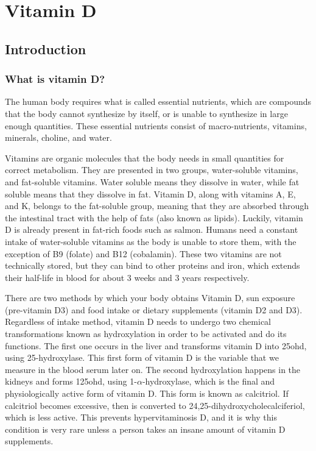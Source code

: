 \chapter{Vitamin D}\label{ch:vitD}

\section{Introduction}

\subsection{What is vitamin D?}

The human body requires what is called essential nutrients, which are compounds that the body cannot synthesize by itself, or is unable to synthesize in large enough quantities. These essential nutrients consist of macro-nutrients, vitamins, minerals, choline, and water.

Vitamins are organic molecules that the body needs in small quantities for correct metabolism. They are presented in two groups, water-soluble vitamins, and fat-soluble vitamins. Water soluble means they dissolve in water, while fat soluble means that they dissolve in fat. Vitamin D, along with vitamins A, E, and K, belongs to the fat-soluble group, meaning that they are absorbed through the intestinal tract with the help of fats (also known as lipids). Luckily, vitamin D is already present in fat-rich foods such as salmon. Humans need a constant intake of water-soluble vitamins as the body is unable to store them, with the exception of B9 (folate) and B12 (cobalamin). These two vitamins are not technically stored, but they can bind to other proteins and iron, which extends their half-life in blood for about 3 weeks and 3 years respectively.

There are two methods by which your body obtains Vitamin D, sun exposure (pre-vitamin D3) and food intake or dietary supplements (vitamin D2 and D3). Regardless of intake method, vitamin D needs to undergo two chemical transformations known as hydroxylation in order to be activated and do its functions. The first one occurs in the liver and transforms vitamin D into \gls{25ohd}, using 25-hydroxylase. This first form of vitamin D is the variable that we measure in the blood serum later on. The second hydroxylation happens in the kidneys and forms \gls{125ohd}, using 1-$\alpha$-hydroxylase, which is the final and physiologically active form of vitamin D. This form is known as calcitriol. If calcitriol becomes excessive, then is converted to 24,25-dihydroxycholecalciferiol, which is less active. This prevents hypervitaminosis D, and it is why this condition is very rare unless a person takes an insane amount of vitamin D supplements.

